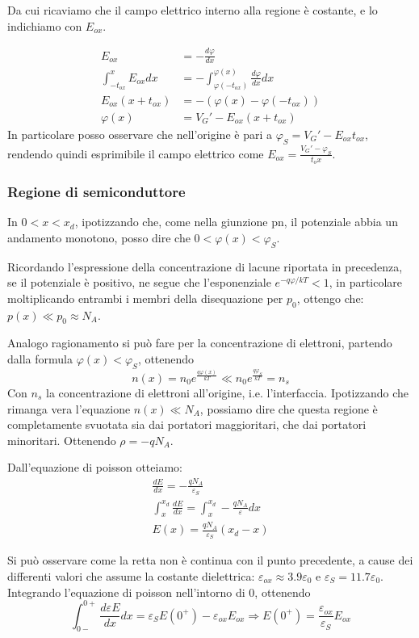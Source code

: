 \documentclass[../template]{subfiles}
\begin{document}
Da cui ricaviamo che il campo elettrico interno alla regione è costante, e lo indichiamo con $E_{ox}$.

\begin{align*}
    E_{ox} &= - \frac{d\varphi}{dx}
    \\
    \int_{-t_{ox}}^x E_{ox} {dx} &= - \int_{\varphi(-t_{ox})}^{\varphi(x)} \frac{d\varphi}{dx} dx
    \\
    E_{ox}(x + t_{ox}) &= - (\varphi(x) - \varphi(-t_{ox}))
    \\
    \varphi(x) &= V_G' -E_{ox}(x + t_{ox})
\end{align*}
In particolare posso osservare che nell'origine è pari a $\varphi_S = V_G' - E_{ox}t_{ox}$, rendendo quindi esprimibile il campo elettrico come
$E_{ox} = \frac{V_G' - \varphi_S}{t_ox}$.

\subsubsection{Regione di semiconduttore}
In $0 < x < x_d$, ipotizzando che, come nella giunzione pn, il potenziale abbia un andamento monotono, posso dire che $0 < \varphi(x) < \varphi_S$.

Ricordando l'espressione della concentrazione di lacune riportata in precedenza, se il potenziale è positivo, ne segue che l'esponenziale
$e^{-q\varphi / kT} < 1$, in particolare moltiplicando entrambi i membri della disequazione per $p_0$, ottengo che: $p(x) \ll p_0 \approx N_A$.

Analogo ragionamento si può fare per la concentrazione di elettroni, partendo dalla formula $\varphi(x) < \varphi_S$, ottenendo
\[
    n(x) = n_0 e^\frac{q \varphi(x)}{kT} \ll n_0 e^\frac{q\varphi_S}{kT} = n_s
\]
Con $n_s$ la concentrazione di elettroni all'origine, i.e. l'interfaccia.
Ipotizzando che rimanga vera l'equazione $n(x) \ll N_A$, possiamo dire che questa regione è completamente svuotata sia dai portatori maggioritari, che dai portatori minoritari.
Ottenendo $\rho = -q N_A$.

Dall'equazione di poisson otteiamo:
\begin{align*}
    \frac{dE}{dx} = -\frac{qN_A}{\varepsilon_S}
    \\
    \int_x^{x_d} \frac{dE}{dx} = \int_{x}^{x_d} - \frac{qN_A}{\varepsilon}dx
    \\
    E(x) = \frac{q N_A}{\varepsilon_S} (x_d - x)
\end{align*}

Si può osservare come la retta non è continua con il punto precedente, a cause dei differenti valori che assume la costante dielettrica: $\varepsilon_{ox} \approx 3.9 \varepsilon_0$ e $\varepsilon_S = 11.7 \varepsilon_0$.
Integrando l'equazione di poisson nell'intorno di 0, ottenendo
\[
    \int_{0-}^{0+} \frac{d\varepsilon E}{dx} dx = \varepsilon_S E (0^+) - \varepsilon_{ox} E_{ox} \Rightarrow
    E(0^+) = \frac{\varepsilon_{ox}}{\varepsilon_S} E_{ox}
\]
\end{document}
